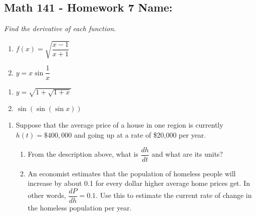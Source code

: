 \documentclass[11pt]{article}
\begin{document}
\pagestyle{empty}
\subsection*{Math 141 - Homework 7 \hfill Name: \underline{\hspace*{2in}}}

\textit{Find the derivative of each function.}
\begin{multicols}{2}
\begin{enumerate}
\item $f(x) = \sqrt{\dfrac{x - 1}{x+1}}$
\item $y = x \sin \dfrac{1}{x}$
\setcounter{enumCount}{\theenumi}
\end{enumerate}
\end{multicols}
\vfill

\begin{multicols}{2}
\begin{enumerate}
\setcounter{enumi}{\theenumCount}
\item $y = \sqrt{1+\sqrt{1+x}}$
\item $\sin(\sin(\sin x))$
\setcounter{enumCount}{\theenumi}
\end{enumerate}
\end{multicols}
\vfill


\begin{enumerate}
\setcounter{enumi}{\theenumCount}
\item Suppose that the average price of a house in one region is currently $h(t) = \$400,000$ and going up at a rate of \$20,000 per year.   
\begin{enumerate}

\item From the description above, what is $\dfrac{dh}{dt}$ and what are its units?
\vfill

\item An economist estimates that the population of homeless people will increase by about 0.1 for every dollar higher average home prices get. In other words, $\dfrac{dP}{dh} = 0.1$. Use this to estimate the current rate of change in the homeless population per year.  
\vfill

\end{enumerate}

\setcounter{enumCount}{\theenumi}
\end{enumerate}
\end{document}

